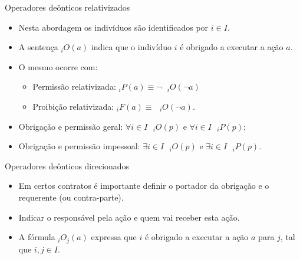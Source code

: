 \begin{frame}{Operadores deônticos relativizados}
	\begin{itemize}
		\item Nesta abordagem os indivíduos são identificados por $i \in I$.
		\item A sentença $_iO(a)$ indica que o indivíduo $i$ é obrigado a executar a ação $a$.
		\item O mesmo ocorre com:
		\begin{itemize}
			\item Permissão relativizada: $_iP(a) \equiv \neg \mbox{ } _iO(\neg a)$ 
			\item Proibição relativizada: $_iF(a) \equiv \mbox{ } _iO(\neg a)$.
		\end{itemize} 
		\item Obrigação e permissão geral: $\forall i \in I\mbox{ }_iO(p) \mbox{ e } \forall i \in I\mbox{ }_iP(p)$;
		\item Obrigação e permissão impessoal: $\exists i \in I\mbox{ }_iO(p) \mbox{ e } \exists i \in I\mbox{ }_iP(p)$.
	\end{itemize}
\end{frame}

\begin{frame}{Operadores deônticos direcionados}
	\begin{itemize}
		\item Em certos contratos é importante definir o portador da obrigação e o requerente (ou contra-parte).
		\item Indicar o responsável pela ação e quem vai receber esta ação.
		\item A fórmula $_iO_j(a)$ expressa que $i$ é obrigado a executar a ação $a$ para $j$, tal que $i,j \in I$.
	\end{itemize}
\end{frame}

